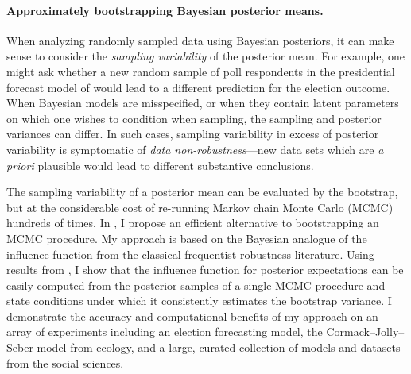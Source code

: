 \paragraph{Approximately bootstrapping Bayesian posterior means.}
%
When analyzing randomly sampled data using Bayesian posteriors, it can make
sense to consider the \emph{sampling variability} of the posterior mean.  For
example, one might ask whether a new random sample of poll respondents in the
presidential forecast model of \citet{economist:2020:election} would lead to a
different prediction for the election outcome.  When Bayesian models are
misspecified, or when they contain latent parameters on which one wishes to
condition when sampling, the sampling and posterior variances can differ.  In
such cases, sampling variability in excess of posterior variability is
symptomatic of \emph{data non-robustness}---new data sets which are \textit{a
priori} plausible would lead to different substantive conclusions.

The sampling variability of a posterior mean can be evaluated by the bootstrap,
but at the considerable cost of re-running Markov chain Monte Carlo (MCMC)
hundreds of times. In \citet{giordano:2020:stanconbayesij,
giordano:2021:bayesij}, I propose an efficient alternative to bootstrapping an
MCMC procedure.  My approach is based on the Bayesian analogue of the influence
function from the classical frequentist robustness literature.  Using results
from \citet{giordano:2018:covariances, giordano:2019:ij}, I show that the
influence function for posterior expectations can be easily computed from the
posterior samples of a single MCMC procedure and state conditions under which it
consistently estimates the bootstrap variance. I demonstrate the accuracy and
computational benefits of my approach on an array of experiments including an
election forecasting model, the Cormack--Jolly--Seber model from ecology, and a
large, curated collection of models and datasets from the social sciences.




